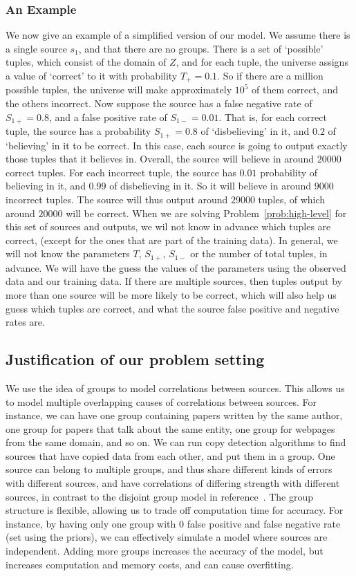 \documentclass{sig-alternate}
\newcounter{prob}
\begin{document}
\subsubsection{An Example}\label{sec:causal-model-example}
We now give an example of a simplified version of our model. We assume there is a single source $s_1$, and that there are no groups. There is a set of `possible' tuples, which consist of the domain of $Z$, and for each tuple, the universe assigns a value of `correct' to it with probability $T_{+}=0.1$. So if there are a million possible tuples, the universe will make approximately $10^5$ of them correct, and the others incorrect. Now suppose the source has a false negative rate of $S_{1+} = 0.8$, and a false positive rate of $S_{1-} = 0.01$. That is, for each correct tuple, the source has a probability $S_{1+} = 0.8$ of `disbelieving' in it, and $0.2$ of `believing' in it to be correct. In this case, each source is going to output exactly those tuples that it believes in. Overall, the source will believe in around $20000$ correct tuples. For each incorrect tuple, the source has $0.01$ probability of believing in it, and $0.99$ of disbelieving in it. So it will believe in around $9000$ incorrect tuples. The source will thus output around $29000$ tuples, of which around $20000$ will be correct. When we are solving Problem~\ref{prob:high-level} for this set of sources and outputs, we wil not know in advance which tuples are correct, (except for the ones that are part of the training data). In general, we will not know the parameters $T$, $S_{1+}$, $S_{1-}$ or the number of total tuples, in advance. We will have the guess the values of the parameters using the observed data and our training data. If there are multiple sources, then tuples output by more than one source will be more likely to be correct, which will also help us guess which tuples are correct, and what the source false positive and negative rates are.

\subsection{Justification of our problem setting}
We use the idea of groups to model correlations between sources. This allows us to model multiple overlapping causes of correlations between sources. For instance, we can have one group containing papers written by the same author, one group for papers that talk about the same entity, one group for webpages from the same domain, and so on. We can run copy detection algorithms to find sources that have copied data from each other, and put them in a group. One source can belong to multiple groups, and thus share different kinds of errors with different sources, and have correlations of differing strength with different sources, in contrast to the disjoint group model in reference~\cite{Qi:2013:MCI:2488388.2488479}. The group structure is flexible, allowing us to trade off computation time for accuracy. For instance, by having only one group with $0$ false positive and false negative rate (set using the priors), we can effectively simulate a model where sources are independent. Adding more groups increases the accuracy of the model, but increases computation and memory costs, and can cause overfitting. 
\end{document}
